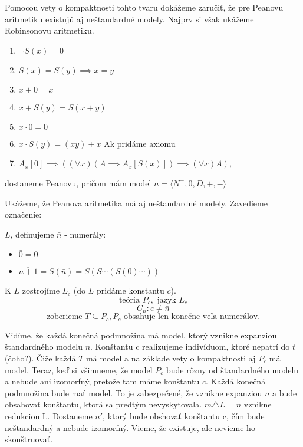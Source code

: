Pomocou vety o kompaktnosti tohto tvaru dokážeme zaručiť, že pre Peanovu aritmetiku
existujú aj neštandardné modely. Najprv si však ukážeme Robinsonovu aritmetiku.

\begin{enumerate}
\item $\neg S(x) = 0$
\item $S(x) = S(y) \implies x=y$
\item $x+0 = x$
\item $x+S(y) = S(x+y)$
\item $x\cdot 0 = 0$
\item $x\cdot S(y)= (xy)+x$
Ak pridáme axiomu
\item $A_x[0] \implies ((\forall x)(A \implies A_x[S(x)]) \implies (\forall x)A)$,
\end{enumerate}
dostaneme Peanovu, pričom mám model $n = \langle N^+,0,D,+,-\rangle$

Ukážeme, že Peanova aritmetika má aj neštandardné modely. Zavedieme označenie:

$L$, definujeme $\bar{n}$ - numerály:
\begin{itemize}
\item $\bar{0} = 0$
\item $\overline{n+1} = S(\bar{n}) = S(S \cdots (S(0) \cdots ))$
\end{itemize}

K $L$ zostrojíme $L_c$ (do $L$ pridáme konstantu $c$).
$$\mbox{teória }P_c,\mbox{ jazyk }L_c$$
$$C_n: c \not= \bar{n}$$
$$\mbox{zoberieme }T \subseteq P_c, P_c \mbox{ obsahuje len konečne veľa numerálov.}$$

Vidíme, že každá konečná podmnožina má model, ktorý vznikne expanziou štandardného modelu $n$.
Konštantu c realizujeme indivíduom, ktoré nepatrí do $t$ (čoho?).
Čiže každá $T$ má model a na základe vety o kompaktnosti aj $P_c$ má model. Teraz, keď si všimneme,
že model $P_c$ bude rôzny od štandardného modelu a nebude ani izomorfný, pretože tam máme konštantu $c$.
Každá konečná podmnožina bude mať model. To je zabezpečené, že vznikne expanziou $n$
a bude obsahovať konštantu, ktorá sa predtým nevyskytovala.
$m\triangle L = n$ vznikne redukciou L. Dostaneme $n'$, ktorý bude obshovať konštantu c,
čím bude neštandardný a nebude izomorfný. Vieme, že existuje, ale nevieme ho skonštruovať.
